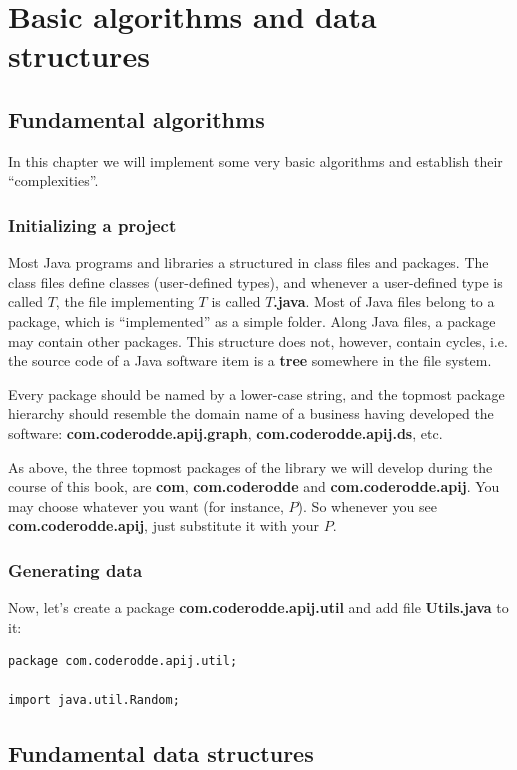 \documentclass[oneside]{book}
\begin{document}
\part{Basic algorithms and data structures}  

\chapter{Fundamental algorithms}
In this chapter we will implement some very basic algorithms and establish their ``complexities''.

\section{Initializing a project}
Most Java programs and libraries a structured in class files and packages. The class files define classes (user-defined types), and whenever a user-defined type is called $T$, the file implementing $T$ is called $T$\textbf{.java}. Most of Java files belong to a package, which is ``implemented'' as a simple folder. Along Java files, a package may contain other packages. This structure does not, however, contain cycles, i.e. the source code of a Java software item is a \textbf{tree} somewhere in the file system. 

Every package should be named by a lower-case string, and the topmost package hierarchy should resemble the domain name of a business having developed the software: \textbf{com.coderodde.apij.graph}, \textbf{com.coderodde.apij.ds}, etc. 

As above, the three topmost packages of the library we will develop during the course of this book, are \textbf{com}, \textbf{com.coderodde} and \textbf{com.coderodde.apij}. You may choose whatever you want (for instance, $P$). So whenever you see \textbf{com.coderodde.apij}, just substitute it with your $P$.
\section{Generating data}
Now, let's create a package \textbf{com.coderodde.apij.util} and add file \textbf{Utils.java} to it:
\begin{lstlisting}
package com.coderodde.apij.util;

import java.util.Random;
\end{lstlisting}

\chapter{Fundamental data structures}
\end{document}
